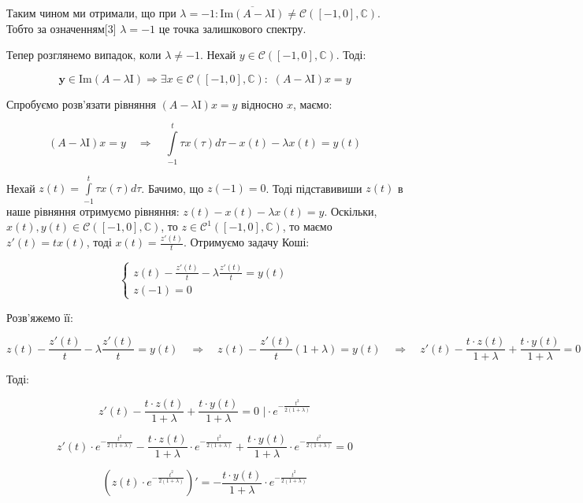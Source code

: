 \documentclass[a5paper, 20pt, titlepage]{article}
\newcommand{\y}{\textbf{y}}
\newcommand{\I}{\mathrm{I}}
\newcommand{\Ima}{\text{Im}}
\begin{document}
Таким чином ми отримали, що при $\lambda = -1:\overline{\Ima (A - \lambda \I)} \neq \mathcal{C} \left( [-1, 0], \mathbb{C} \right)$. Тобто за означенням[3] $\lambda = -1 $ це точка залишкового спектру.  

Тепер розглянемо випадок, коли $\lambda \neq -1$. Нехай $y \in \mathcal{C} \left( [-1, 0], \mathbb{C} \right)$. Тоді:

\vspace{-3mm}
$$ \y \in \Ima(A - \lambda \I) \Rightarrow \exists x \in \mathcal{C} \left( [-1, 0], \mathbb{C} \right): \,\, (A - \lambda \I)x = y$$

Спробуємо розв'язати рівняння $(A - \lambda \I)x = y$ відносно $x$, маємо:

$$ (A - \lambda \I)x = y \quad \Rightarrow \quad  \int \limits_{-1}^{t} \tau x(\tau) d \tau - x(t) - \lambda x(t) = y(t)$$ 

Нехай $z(t) =  \int \limits_{-1}^{t} \tau x(\tau) d \tau$. Бачимо, що $z(-1) = 0$. Тоді підставивиши $z(t)$ в наше рівняння  отримуємо рівняння: $z(t) - x(t) - \lambda x(t) = y$. Оскільки,  $x(t), y(t) \in \mathcal{C} \left( [-1, 0], \mathbb{C} \right)$, то $z \in \mathcal{C}^1 \left( [-1, 0], \mathbb{C} \right)$, то маємо \\ $z'(t) = t x(t)$, тоді $x(t) = \frac{z'(t)}{t}$. Отримуємо задачу Коші:

$$
\begin{cases}
z(t) - \frac{z'(t)}{t} - \lambda \frac{z'(t)}{t} = y(t) \\
z(-1) = 0
\end{cases}
$$

Розв'яжемо її:

\vspace{-3mm}
$$ z(t) - \frac{z'(t)}{t} - \lambda \frac{z'(t)}{t} = y(t) \quad \Rightarrow \quad z(t) - \frac{z'(t)}{t} \left(1 + \lambda \right) = y(t) \quad \Rightarrow \quad  z'(t) - \frac{t \cdot z(t)}{1 + \lambda} + \frac{t \cdot y(t)}{1+ \lambda} = 0$$

Тоді:

$$ z'(t) - \frac{t \cdot z(t)}{1 + \lambda} + \frac{t \cdot y(t)}{1+ \lambda} = 0 \,\, \biggl| \cdot e^{-\frac{t^2}{2(1+\lambda)}} $$

$$ z'(t) \cdot e^{-\frac{t^2}{2(1+\lambda)}}  - \frac{t \cdot z(t)}{1 + \lambda} \cdot e^{-\frac{t^2}{2(1+\lambda)}} + \frac{t \cdot y(t)}{1+ \lambda} \cdot e^{-\frac{t^2}{2(1+\lambda)}} = 0 $$

$$ \left( z(t) \cdot e^{-\frac{t^2}{2(1+\lambda)}} \right)' = - \frac{t \cdot y(t)}{1+ \lambda} \cdot e^{-\frac{t^2}{2(1+\lambda)}}$$ 
\end{document}
